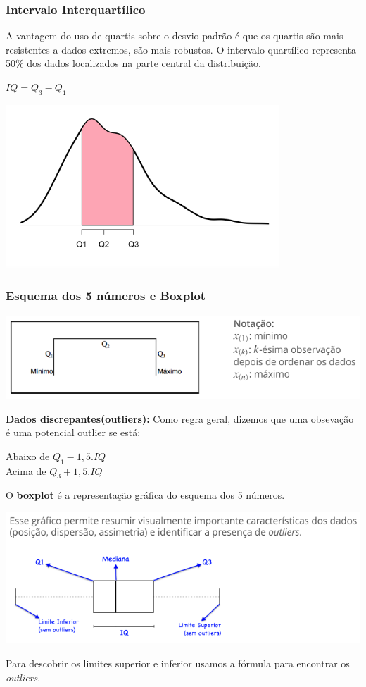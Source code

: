 \documentclass[a4paper, 12pt]{article}
\begin{document}
\subsubsection{Intervalo Interquartílico}
	A vantagem do uso de quartis sobre o desvio padrão é que os quartis são mais resistentes a dados extremos, são mais robustos.
	O intervalo quartílico representa 50\% dos dados localizados na parte central da distribuição.
	\begin{center}
		\LARGE
		$IQ = Q_{3} - Q_{1}$
	\end{center}
	\begin{center}
		\includegraphics[width=0.4\linewidth]{imagens/iq.png}
	\end{center}
	
\subsubsection{Esquema dos 5 números e Boxplot}
	\begin{center}
		\includegraphics[width=0.7\linewidth]{imagens/esquema}
	\end{center}
	
	\textbf{Dados discrepantes(outliers):} Como regra geral, dizemos que uma obsevação é uma potencial outlier se está:
		\begin{center}
			Abaixo de $Q_{1} - 1,5.IQ$\\
			Acima de $Q_{3} + 1,5.IQ$
		\end{center}
		
	O \textbf{boxplot} é a representação gráfica do esquema dos 5 números.
	\begin{center}
		\includegraphics[width=0.9\linewidth]{imagens/boxplot}
	\end{center}
	Para descobrir os limites superior e inferior usamos a fórmula para encontrar os \textit{outliers}. 
	
\end{document}
